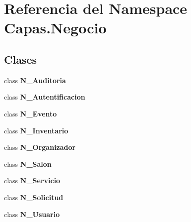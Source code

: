 \section{Referencia del Namespace Capas.\+Negocio}
\label{namespace_capas_1_1_negocio}
\subsection*{Clases}
\begin{DoxyCompactItemize}
\item 
class {\bf N\+\_\+\+Auditoria}
\item 
class {\bf N\+\_\+\+Autentificacion}
\item 
class {\bf N\+\_\+\+Evento}
\item 
class {\bf N\+\_\+\+Inventario}
\item 
class {\bf N\+\_\+\+Organizador}
\item 
class {\bf N\+\_\+\+Salon}
\item 
class {\bf N\+\_\+\+Servicio}
\item 
class {\bf N\+\_\+\+Solicitud}
\item 
class {\bf N\+\_\+\+Usuario}
\end{DoxyCompactItemize}
